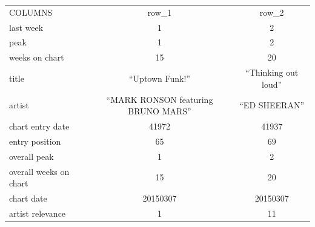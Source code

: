 \documentclass[11pt]{article} %
\begin{document}
\begin{table}[H]
	\centering
	\begin{tabular}{|l|c|c|}
		COLUMNS & row\_1 & row\_2 \\
		last week              & 1 & 2 \\
		peak                   & 1 & 2 \\
		weeks on chart         & 15 & 20 \\
		title                  & ``Uptown Funk!'' & ``Thinking out loud'' \\
		artist                 & ``MARK RONSON featuring BRUNO MARS'' & ``ED SHEERAN'' \\
		chart entry date       & 41972 & 41937 \\
		entry position         & 65 & 69 \\
		overall peak           & 1 & 2 \\
		overall weeks on chart & 15 & 20 \\
		chart date             & 20150307 & 20150307 \\
		artist relevance       & 1 & 11
	\end{tabular}
\end{table}

\end{document}
